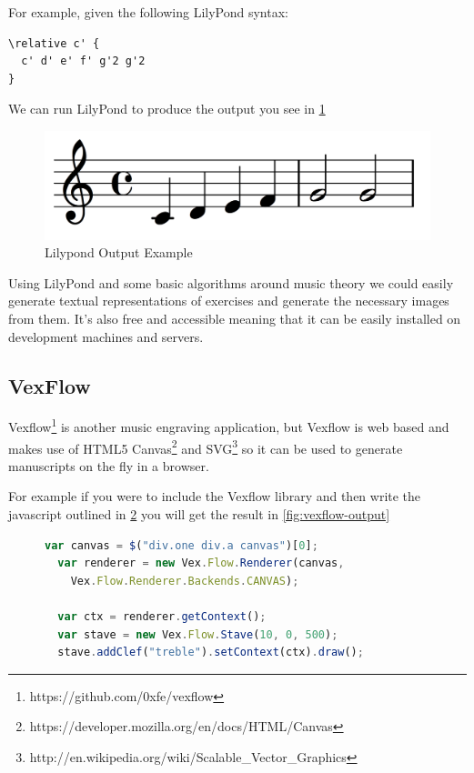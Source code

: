For example, given the following LilyPond syntax:

\begin{lstlisting}
\relative c' {
  c' d' e' f' g'2 g'2
}
\end{lstlisting}

We can run LilyPond to produce the output you see in \cref{fig:lilypond-output}

\begin{figure}[h!]
  \includegraphics[width=\linewidth]{gfx/background/lilypond-output.png}
  \centering
  \caption{Lilypond Output Example}
  \label{fig:lilypond-output}
\end{figure}

Using LilyPond and some basic algorithms around music theory we could easily generate textual representations of exercises and generate the necessary images from them. It's also free and accessible meaning that it can be easily installed on development machines and servers.

\subsection{VexFlow}

Vexflow\footnote{https://github.com/0xfe/vexflow} is another music engraving application, but Vexflow is web based and makes use of HTML5 Canvas\footnote{https://developer.mozilla.org/en/docs/HTML/Canvas} and SVG\footnote{http://en.wikipedia.org/wiki/Scalable\_Vector\_Graphics} so it can be used to generate manuscripts on the fly in a browser.

For example if you were to include the Vexflow library and then write the javascript outlined in \cref{lst:vexflow} you will get the result in \cref{fig:vexflow-output}

\begin{figure}[h!]
  \begin{lstlisting}[language=JavaScript]
  var canvas = $("div.one div.a canvas")[0];
  var renderer = new Vex.Flow.Renderer(canvas,
    Vex.Flow.Renderer.Backends.CANVAS);

  var ctx = renderer.getContext();
  var stave = new Vex.Flow.Stave(10, 0, 500);
  stave.addClef("treble").setContext(ctx).draw();
  \end{lstlisting}
  \label{lst:vexflow}
\end{figure}

